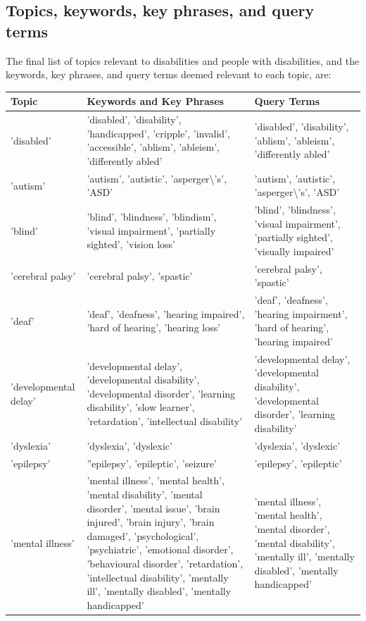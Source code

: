 \documentclass{report}
\begin{document}
\subsection{Topics, keywords, key phrases, and query terms} \label{topics}

The final list of topics relevant to disabilities and people with disabilities, and the keywords, key phrases, and query terms deemed relevant to each topic, are: 

\begin{longtabu} to \textwidth { | X[l] | X[l] | X[l] | } 
	\hline
	Topic & Keywords and Key Phrases & Query Terms \\ 
	\hline
	'disabled' & 'disabled', 'disability', 'handicapped', 'cripple', 'invalid', 'accessible', 'ablism', 'ableism', 'differently abled' & 'disabled', 'disability', 'ablism', 'ableism', 'differently abled' \\ 
	\hline
	'autism' & 'autism', 'autistic', 'asperger\textbackslash's', 'ASD' & 'autism', 'autistic', 'asperger\textbackslash's', 'ASD' \\ 
	\hline
	'blind' & 'blind', 'blindness', 'blindism', 'visual impairment', 'partially sighted', 'vision loss' & 'blind', 'blindness', 'visual impairment', 'partially sighted', 'visually impaired' \\ 
	\hline
	'cerebral palsy' & 'cerebral palsy', 'spastic' & 'cerebral palsy', 'spastic' \\ 
	\hline
	'deaf' & 'deaf', 'deafness', 'hearing impaired', 'hard of hearing', 'hearing loss' & 'deaf', 'deafness', 'hearing impairment', 'hard of hearing', 'hearing impaired' \\ 
	\hline
	'developmental delay' & 'developmental delay', 'developmental disability', 'developmental disorder', 'learning disability', 'slow learner', 'retardation', 'intellectual disability' & 'developmental delay', 'developmental disability', 'developmental disorder', 'learning disability' \\ 
	\hline
	'dyslexia' & 'dyslexia', 'dyslexic' & 'dyslexia', 'dyslexic' \\ 
	\hline
	'epilepsy' & ''epilepsy', 'epileptic', 'seizure' & 'epilepsy', 'epileptic' \\ 
	\hline
	'mental illness' & 'mental illness', 'mental health', 'mental disability', 'mental disorder', 'mental issue', 'brain injured', 'brain injury', 'brain damaged', 'psychological', 'psychiatric', 'emotional disorder', 'behavioural disorder', 'retardation', 'intellectual disability', 'mentally ill', 'mentally disabled', 'mentally handicapped' & 'mental illness', 'mental health', 'mental disorder', 'mental disability', 'mentally ill', 'mentally disabled', 'mentally handicapped' \\ 

\end{longtabu}
\end{document}
